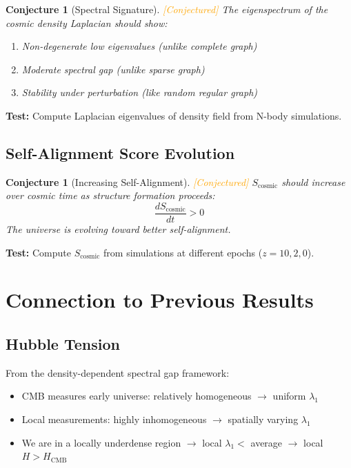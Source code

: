 \documentclass[11pt,a4paper]{article}
\theoremstyle{plain}
\newtheorem{conjecture}[theorem]{Conjecture}
\theoremstyle{definition}
\theoremstyle{remark}
\newcommand{\conjectured}{\textcolor{orange}{[Conjectured]}}
\begin{document}
\begin{conjecture}[Spectral Signature] \conjectured
The eigenspectrum of the cosmic density Laplacian should show:
\begin{enumerate}[label=(\roman*),noitemsep]
    \item Non-degenerate low eigenvalues (unlike complete graph)
    \item Moderate spectral gap (unlike sparse graph)
    \item Stability under perturbation (like random regular graph)
\end{enumerate}
\end{conjecture}

\textbf{Test:} Compute Laplacian eigenvalues of density field from N-body simulations.

\subsection{Self-Alignment Score Evolution}

\begin{conjecture}[Increasing Self-Alignment] \conjectured
$S_{\text{cosmic}}$ should increase over cosmic time as structure formation proceeds:
\[
\frac{dS_{\text{cosmic}}}{dt} > 0
\]
The universe is evolving toward better self-alignment.
\end{conjecture}

\textbf{Test:} Compute $S_{\text{cosmic}}$ from simulations at different epochs ($z = 10, 2, 0$).

\section{Connection to Previous Results}

\subsection{Hubble Tension}

From the density-dependent spectral gap framework:
\begin{itemize}[noitemsep]
    \item CMB measures early universe: relatively homogeneous $\to$ uniform $\lambda_1$
    \item Local measurements: highly inhomogeneous $\to$ spatially varying $\lambda_1$
    \item We are in a locally underdense region $\to$ local $\lambda_1 <$ average $\to$ local $H > H_{\text{CMB}}$
\end{itemize}
\end{document}
